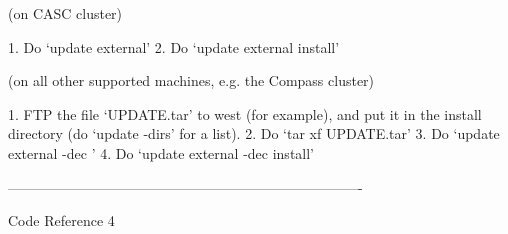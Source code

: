 \documentclass{article}
\begin{document}
\begin{cxxentry}
\begin{cxxdoc}
(on CASC cluster)

1. Do `update external'
2. Do `update external install'

(on all other supported machines, e.g. the Compass cluster)

1. FTP the file `UPDATE.tar' to west (for example), and put it
in the install directory (do `update -dirs' for a list).
2. Do `tar xf UPDATE.tar'
3. Do `update external -dec '
4. Do `update external -dec install'

----------------------------------------------------------------------------

\end{cxxdoc}
\end{cxxentry}
\begin{cxxentry}
{}
        {Code Reference}
        {}
        {}
        {4}
\end{cxxentry}
\end{document}

